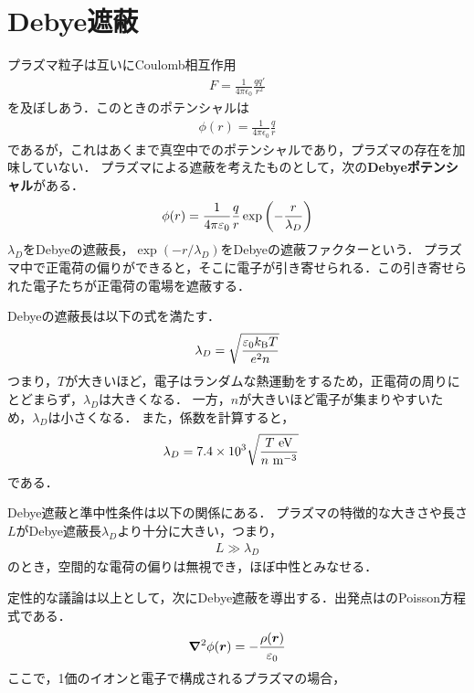 \documentclass{report}
\begin{document}
  \section{Debye遮蔽}
    プラズマ粒子は互いにCoulomb相互作用
    \begin{align}
      F = \frac{1}{4\pi \epsilon_0}\frac{qq'}{r^2}
    \end{align}
    を及ぼしあう．このときのポテンシャルは
    \begin{align}
      \phi(r) = \frac{1}{4\pi \epsilon_0}\frac{q}{r}
    \end{align}
    であるが，これはあくまで真空中でのポテンシャルであり，プラズマの存在を加味していない．
    プラズマによる遮蔽を考えたものとして，次の\textbf{Debyeポテンシャル}がある．
    \begin{align}
      \phi(r) = \frac{1}{4\pi\varepsilon_0}\frac{q}{r}\exp\qty(-\frac{r}{\lambda_D})
    \end{align}
    $\lambda_D$をDebyeの遮蔽長，$\exp(-r/\lambda_D)$をDebyeの遮蔽ファクターという．
    プラズマ中で正電荷の偏りができると，そこに電子が引き寄せられる．この引き寄せられた電子たちが正電荷の電場を遮蔽する．
    \par
    Debyeの遮蔽長は以下の式を満たす．
    \begin{align}
      \lambda_D = \sqrt{\frac{\varepsilon_0 k_{\mathrm{B}} T}{e^2 n}}
    \end{align}
    つまり，$T$が大きいほど，電子はランダムな熱運動をするため，正電荷の周りにとどまらず，$\lambda_D$は大きくなる．
    一方，$n$が大きいほど電子が集まりやすいため，$\lambda_D$は小さくなる．
    また，係数を計算すると，
    \begin{align}
      \lambda_D &= 7.4\times 10^3\sqrt{\frac{T\ \r{eV}}{n\ \r{m^{-3}}}}
    \end{align}
    である．
    \par
    Debye遮蔽と準中性条件は以下の関係にある．
    プラズマの特徴的な大きさや長さ$L$がDebye遮蔽長$\lambda_D$より十分に大きい，つまり，
    \begin{align}
      L \gg \lambda_D
    \end{align}
    のとき，空間的な電荷の偏りは無視でき，ほぼ中性とみなせる．
    \par
    定性的な議論は以上として，次にDebye遮蔽を導出する．出発点はのPoisson方程式である．
    \begin{align}
      \grad^2 \phi(\bm{r}) = -\frac{\rho(\bm{r})}{\varepsilon_0} \label{poisson-eq}
    \end{align}
    ここで，1価のイオンと電子で構成されるプラズマの場合，
\end{document}
